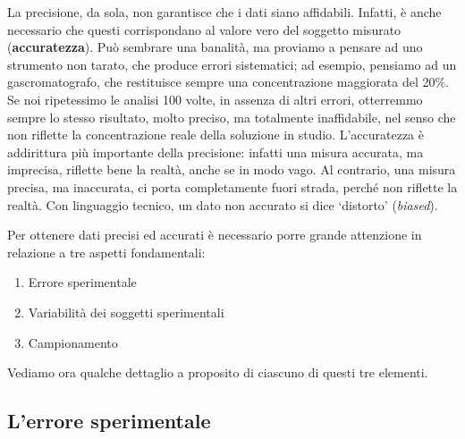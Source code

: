 \documentclass[a4paper,12pt,oneside]{book}
\providecommand{\tightlist}{%
  \setlength{\itemsep}{0pt}\setlength{\parskip}{0pt}}
\begin{document}
La precisione, da sola, non garantisce che i dati siano affidabili. Infatti, è anche necessario che questi corrispondano al valore vero del soggetto misurato (\textbf{accuratezza}). Può sembrare una banalità, ma proviamo a pensare ad uno strumento non tarato, che produce errori sistematici; ad esempio, pensiamo ad un gascromatografo, che restituisce sempre una concentrazione maggiorata del 20\%. Se noi ripetessimo le analisi 100 volte, in assenza di altri errori, otterremmo sempre lo stesso risultato, molto preciso, ma totalmente inaffidabile, nel senso che non riflette la concentrazione reale della soluzione in studio. L'accuratezza è addirittura più importante della precisione: infatti una misura accurata, ma imprecisa, riflette bene la realtà, anche se in modo vago. Al contrario, una misura precisa, ma inaccurata, ci porta completamente fuori strada, perché non riflette la realtà. Con linguaggio tecnico, un dato non accurato si dice `distorto' (\emph{biased}).

Per ottenere dati precisi ed accurati è necessario porre grande attenzione in relazione a tre aspetti fondamentali:

\begin{enumerate}
\def\labelenumi{\arabic{enumi}.}
\tightlist
\item
  Errore sperimentale
\item
  Variabilità dei soggetti sperimentali
\item
  Campionamento
\end{enumerate}

Vediamo ora qualche dettaglio a proposito di ciascuno di questi tre elementi.

\hypertarget{lerrore-sperimentale}{%
\subsection{L'errore sperimentale}\label{lerrore-sperimentale}}
\end{document}
